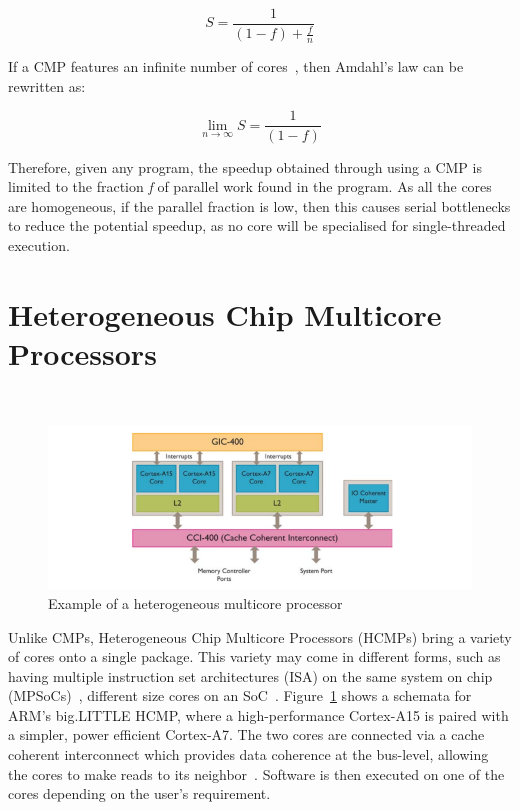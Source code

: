 \begin{equation}
S = \frac{1}{(1-f) + \frac{f}{n}}
\end{equation}\label{amdlaw}

If a CMP features an infinite number of cores~\cite{eyerman2010amdahl}, then Amdahl's law can be rewritten as:

\begin{equation}
\lim_{n\to\infty} S = \frac{1}{(1-f)}
\end{equation}

Therefore, given any program, the speedup obtained through using a CMP is limited to the fraction \textit{f} of parallel work found in the program.
As all the cores are homogeneous, if the parallel fraction is low, then this causes serial bottlenecks to reduce the potential speedup, as no core will be specialised for single-threaded execution.
\section{Heterogeneous Chip Multicore Processors}~\label{sec:hcmp}

\begin{figure}[t]
 \center
 \includegraphics[width=1\textwidth]{background/graphics/biglittle.png}
 	\vspace{-3em}

 \caption{Example of a heterogeneous multicore processor~\cite{armbig}}\label{fig:blarm}
\end{figure}
\vspace{-1em}

Unlike CMPs, Heterogeneous Chip Multicore Processors (HCMPs) bring a variety of cores onto a single package.
This variety may come in different forms, such as having multiple instruction set architectures (ISA) on the same system on chip (MPSoCs)~\cite{venkat2014harnessingisa,venkatHipstr2016}, different size cores on an SoC~\cite{armbig,jeff2012big}.
Figure~\ref{fig:blarm} shows a schemata for ARM's big.LITTLE HCMP, where a high-performance Cortex-A15 is paired with a simpler, power efficient Cortex-A7.
The two cores are connected via a cache coherent interconnect which provides data coherence at the bus-level, allowing the cores to make reads to its neighbor~\cite{armbig}.
Software is then executed on one of the cores depending on the user's requirement.

